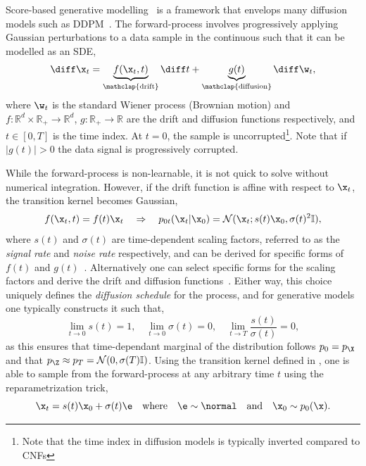 Score-based generative modelling~\cite{ScoreMatching, ScoreBasedGenerativeModeling} is a framework that envelops many diffusion models such as DDPM~\cite{DDPM}.
The forward-process involves progressively applying Gaussian perturbations to a data sample in the continuous such that it can be modelled as an SDE,
\begin{equation}
    \label{eq:sde}
    \diff \x_t = \underbrace{f(\x_t, t)}_{\mathclap{\text{drift}}} \diff t + \underbrace{g(t)}_{\mathclap{\text{diffusion}}} \diff \w_t,
\end{equation}
where $\w_t$ is the standard Wiener process (Brownian motion) and $f: \mathbb{R}^d \times \mathbb{R}_{+} \rightarrow \mathbb{R}^d$, $g: \mathbb{R}_{+} \rightarrow \mathbb{R}$ are the drift and diffusion functions respectively, and $t \in [0, T]$ is the time index.
At $t=0$, the sample is uncorrupted\footnote{Note that the time index in diffusion models is typically inverted compared to CNFs}.
Note that if $|g(t)| > 0$ the data signal is progressively corrupted.

While the forward-process is non-learnable, it is not quick to solve without numerical integration.
However, if the drift function is affine with respect to $\x_t$, the transition kernel becomes Gaussian,
\begin{equation}
    \label{eq:gaussian_kernel}
    f(\x_t, t) = f(t)\x_t \quad \Rightarrow \quad p_{0t}(\x_t|\x_0) = \mathcal{N}(\x_t; s(t)\x_0, \sigma(t)^2 \mathbb{I}),
\end{equation}
where $s(t)$ and $\sigma(t)$ are time-dependent scaling factors, referred to as the \textit{signal rate} and \textit{noise rate} respectively, and can be derived for specific forms of $f(t)$ and $g(t)$~\cite{sarkka2019applied}.
Alternatively one can select specific forms for the scaling factors and derive the drift and diffusion functions~\cite{ElucidatingDesignSpace}.
Either way, this choice uniquely defines the \textit{diffusion schedule} for the process, and for generative models one typically constructs it such that,
\begin{equation}
    \label{eq:diffusion_schedule}
    \lim_{t \rightarrow 0} s(t) = 1, \quad \lim_{t \rightarrow 0} \sigma(t) = 0, \quad \lim_{t \rightarrow T} \frac{s(t)}{\sigma(t)} = 0,
\end{equation}
as this ensures that time-dependant marginal of the distribution follows $p_0 = p_\X$ and that $p_\Z \approx p_T = \mathcal{N}(0, \sigma(T) \mathbb{I})$.
Using the transition kernel defined in , one is able to sample from the forward-process at any arbitrary time $t$ using the reparametrization trick,
\begin{equation}
    \label{eq:reparametrization}
    \x_t = s(t)\x_0 + \sigma(t) \e \quad \text{where} \quad \e \sim \normal \quad \text{and} \quad \x_0 \sim p_0(\x).
\end{equation}

